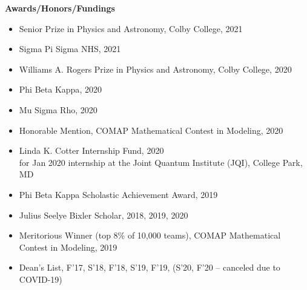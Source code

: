 \documentclass[10pt]{article}
\begin{document}
%
%
%





\noindent \large{\textbf{{Awards/Honors/Fundings}}}  \normalsize \vspace{-5pt} 
\begin{itemize}
	\setlength\itemsep{-4pt}
	\item Senior Prize in Physics and Astronomy, Colby College, {2021}
	\item Sigma Pi Sigma NHS, {2021}
	\item {Williams A. Rogers Prize in Physics and Astronomy}, Colby College, {2020} 
	\item {Phi Beta Kappa}, {2020} 
	\item {Mu Sigma Rho}, {2020}
	\item {Honorable Mention,}  COMAP Mathematical Contest in Modeling, {2020}
	\item {Linda K. Cotter Internship Fund}, {2020}\\
	      for Jan 2020 internship at the Joint Quantum Institute (JQI), College Park, MD
	\item {Phi Beta Kappa Scholastic Achievement Award,} {2019}
	\item {Julius Seelye Bixler Scholar,} {2018, 2019, 2020}
	\item {Meritorious Winner (top 8\% of 10,000 teams),}  COMAP Mathematical Contest in Modeling, {2019}
	\item {Dean’s List}, {F'17, S'18, F'18, S'19, F'19, (S'20, F'20 -- canceled due to COVID-19)}
\end{itemize}
\end{document}

